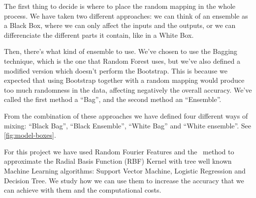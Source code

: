 \begin{pre-delivery}
  The first thing to decide is where to place the random mapping in the whole
  process. We have taken two different approaches: we can think of an
  ensemble as a Black Box, where we can only affect the inputs and the outputs,
  or we can differenciate the different parts it contain, like in a White Box.

  Then, there's what kind of ensemble to use. We've chosen to use the
  Bagging technique, which is the one that Random Forest uses, but we've
  also defined a modified version which doesn't perform the Bootstrap. This is
  because we expected that using Bootstrap together with a random mapping would
  produce too much randomness in the data, affecting negatively the
  overall accuracy. We've called the first method a ``Bag'', and the second
  method an ``Ensemble''.

  From the combination of these approaches we have defined four different
  ways of mixing: ``Black Bag'', ``Black Ensemble'', ``White Bag'' and
  ``White ensemble''. See \ref{fig:model-boxes}.

  For this project we have used Random Fourier Features and the \Nys\
  method to approximate the Radial Basis Function (RBF) Kernel with tree
  well known Machine Learning algorithms: Support Vector Machine, Logistic
  Regression and Decision Tree. We study how we can use them to increase
  the accuracy that we can achieve with them and the computational costs.


\end{pre-delivery}
